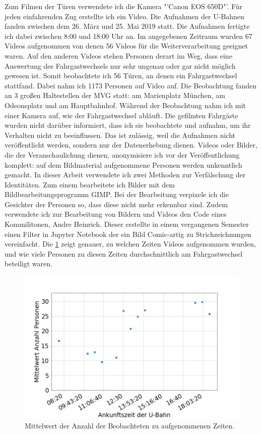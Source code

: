 Zum Filmen der Türen verwendete ich die Kamera "'Canon EOS 650D"'. Für jeden einfahrenden Zug erstellte ich ein Video. Die Aufnahmen der U-Bahnen fanden zwischen dem 26. März und 25. Mai 2019 statt. Die Aufnahmen fertigte ich dabei zwischen 8:00 und 18:00 Uhr an. Im angegebenen Zeitraum wurden 67 Videos aufgenommen von denen 56 Videos für die Weiterverarbeitung geeignet waren. Auf den anderen Videos stehen Personen derart im Weg, dass eine Auswertung des Fahrgastwechsels nur sehr ungenau oder gar nicht möglich gewesen ist. Somit beobachtete ich 56 Türen, an denen ein Fahrgastwechsel stattfand. Dabei nahm ich 1173 Personen auf Video auf. Die Beobachtung fanden an 3 großen Haltestellen der MVG statt: am Marienplatz München, am Odeonsplatz und am Hauptbahnhof. Während der Beobachtung nahm ich mit einer Kamera auf, wie der Fahrgastwechsel abläuft. Die gefilmten Fahrgäste wurden nicht darüber informiert, dass ich sie beobachtete und aufnahm, um ihr Verhalten nicht zu beeinflussen. Das ist zulässig, weil die Aufnahmen nicht veröffentlicht werden, sondern nur der Datenerhebung dienen. Videos oder Bilder, die der Veranschaulichung dienen, anonymisiere ich vor der Veröffentlichung komplett: auf dem Bildmaterial aufgenommene Personen werden unkenntlich gemacht. In dieser Arbeit verwendete ich zwei Methoden zur Verfälschung der Identitäten. Zum einem bearbeitete ich Bilder mit dem Bildbearbeitungsprogramm \textsf{GIMP}. Bei der Bearbeitung verpixele ich die Gesichter der Personen so, dass diese nicht mehr erkennbar sind. Zudem verwendete ich zur Bearbeitung von Bildern und Videos den Code eines Kommilitonen, Andre Heinrich. Dieser erstellte in einem vergangenen Semester einen Filter in \textsf{Jupyter Notebook} der ein Bild Comic-artig zu Strichzeichnungen vereinfacht.
Die \figurename \ref{fig:PersonenUberZeit} zeigt genauer, zu welchen Zeiten Videos aufgenommen wurden, und wie viele Personen zu diesen Zeiten durchschnittlich am Fahrgastwechsel beteiligt waren.
\begin{figure}[H]
	\centering
		\includegraphics[width=1.0\textwidth]{pictures/observation/recording/peopleOverTime.png}
	\caption{Mittelwert der Anzahl der Beobachteten zu aufgenommenen Zeiten.}
	\label{fig:PersonenUberZeit}
\end{figure}
